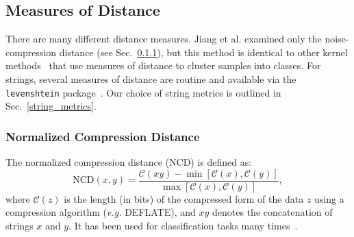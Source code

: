 \documentclass{article}
\begin{document}
\subsection{Measures of Distance}
There are many different distance measures. Jiang et al. examined only the noise-compression distance (see Sec.~\ref{ncd}), but this method is identical to other kernel methods~\cite{} that use measures of distance to cluster samples into classes. For strings, several measures of distance are routine and available via the \texttt{levenshtein} package~\cite{levenshtein}. Our choice of string metrics is outlined in Sec.~\ref{string_metrics}.






\subsubsection{Normalized Compression Distance}
\label{ncd}
The normalized compression distance (NCD) is defined as:
\begin{equation}
    \text{NCD}(x, y) = \frac{\mathcal{C}(xy) - \min[\mathcal{C}(x), \mathcal{C}(y)]}{\max[\mathcal{C}(x), \mathcal{C}(y)]},
\end{equation}
where $\mathcal{C}(z)$ is the length (in bits) of the compressed form of the data $z$ using a compression algorithm (\textit{e.g.} DEFLATE), and $xy$ denotes the concatenation of strings $x$ and $y$. It has been used for classification tasks many times~\cite{opitz2023gzip,weinreich2023parameter,nishida2011tweet,jiang2022less}.
\end{document}
